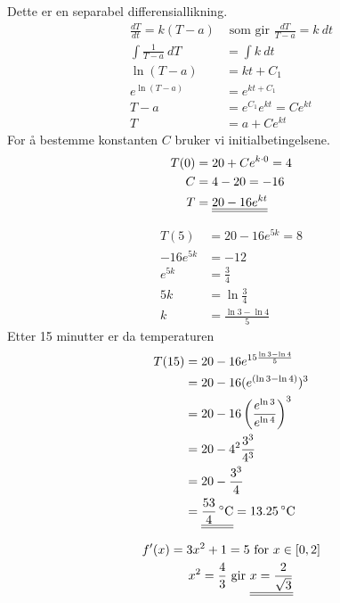 \documentclass[a4paper,norsk,12pt]{article}
\begin{document}
Dette er en separabel differensiallikning.
\begin{align*}
  \frac{dT}{dt}  = k(T-a) & \text{ som gir }
  \frac{dT}{T-a}  = k~dt \\
  \int{\frac{1}{T-a}~dT} & = \int{ k~dt } \\
  \ln{(T-a)} & = kt + C_1 \\
  e^{\ln{(T-a)}} & = e^{kt + C_1} \\
  T-a & = e^{C_1} e^{kt} = Ce^{kt} \\
  T & = a + Ce^{kt}
\end{align*}
For å bestemme konstanten $C$ bruker vi initialbetingelsene.
\begin{align*}
  T(0) &= 20 + Ce^{k\cdot0} = 4 \\
  C &= 4 - 20 = -16 \\
  T &= {\underline{\underline{20 - 16e^{kt}}}}
\end{align*}

\begin{align*}
  T(5) & = 20-16e^{5k} = 8 \\
  -16e^{5k} & = -12 \\
  e^{5k} & = \frac{3}{4} \\
  5k & = \ln\frac{3}{4} \\
  k & = \frac{\ln 3 - \ln 4}{5}
\end{align*}
Etter 15 minutter er da temperaturen
\begin{align*}
  T(15) & = 20 - 16e^{15\frac{\ln 3 - \ln 4}{5}} \\
        & = 20 - 16(e^{(\ln 3 - \ln 4)})^3 \\
        & = 20 - 16\left( \frac{e^{\ln 3}}{e^{\ln 4}} \right)^3 \\
        & = 20 - 4^2\frac{3^3}{4^3} \\
        & = 20 - \frac{3^3}{4} \\
        & = \svar{\unit[\frac{53}{4}]{^\circ C}} = \unit[13.25]{^\circ C}
\end{align*}


\begin{align*}
  f'(x) = 3x^2 + 1 & = 5 \text{ for } x \in [0,2]\\
  x^2 = \frac{4}{3} & \text{ gir }
  \svar{x = \frac{2}{\sqrt{3}}}
\end{align*}
\end{document}
